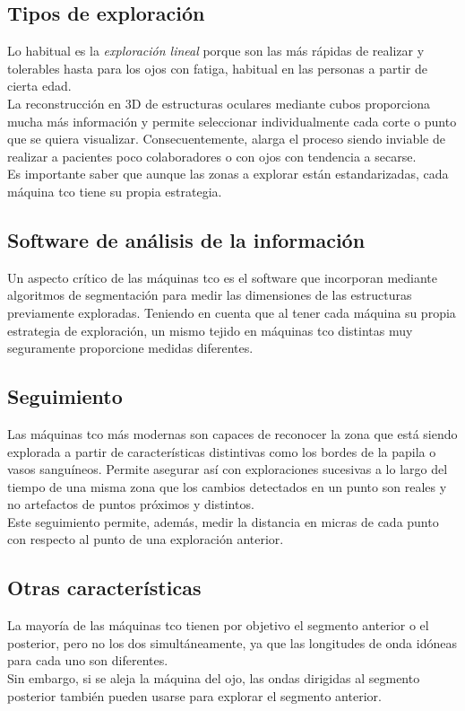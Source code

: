 \subsection{Tipos de exploración}
Lo habitual es la \emph{exploración lineal} porque son las más rápidas
de realizar y tolerables hasta para los ojos con
fatiga, habitual en las personas a partir de cierta edad.\\
La reconstrucción en 3D de estructuras oculares mediante cubos
proporciona mucha más información y permite seleccionar
individualmente cada corte o punto que se quiera
visualizar. Consecuentemente, alarga el proceso siendo inviable de
realizar a pacientes poco colaboradores o con ojos con tendencia a
secarse.\\
Es importante saber que aunque las zonas a explorar están estandarizadas, cada máquina
\gls{tco} tiene su propia estrategia.

\subsection{Software de análisis de la información}
Un aspecto crítico de las máquinas \gls{tco} es el software que
incorporan mediante algoritmos de segmentación para medir las
dimensiones de las estructuras previamente exploradas. Teniendo en
cuenta que al tener cada máquina su propia estrategia de exploración,
un mismo tejido en máquinas \gls{tco} distintas muy seguramente proporcione
medidas diferentes.

\subsection{Seguimiento}
Las máquinas \gls{tco} más modernas son capaces de reconocer la zona
que está siendo explorada a partir de características distintivas como
los bordes de la papila o vasos sanguíneos. Permite asegurar así con
exploraciones sucesivas a lo largo del tiempo de una misma zona que
los cambios detectados en un punto son reales y no artefactos de
puntos próximos y distintos.\\
Este seguimiento permite, además, medir la distancia en micras de cada
punto con respecto al punto de una exploración anterior.

\subsection{Otras características}
La mayoría de las máquinas \gls{tco} tienen por objetivo el segmento
anterior o el posterior, pero no los dos simultáneamente, ya que
las longitudes de onda idóneas para cada uno son diferentes.\\
Sin embargo, si se aleja la máquina del ojo, las ondas dirigidas 
al segmento posterior también pueden usarse para explorar el segmento anterior.

